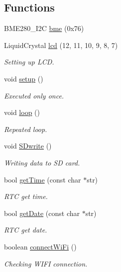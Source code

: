 \subsection*{Functions}
\begin{DoxyCompactItemize}
\item 
B\+M\+E280\+\_\+\+I2C \hyperlink{_w_s_8ino_aaa44a3bc15fc4819e1e0e66a80d6a693}{bme} (0x76)
\item 
Liquid\+Crystal \hyperlink{_w_s_8ino_aca85f744646bfbc6d0f732f3b0b938f3}{lcd} (12, 11, 10, 9, 8, 7)
\begin{DoxyCompactList}\small\item\em Setting up L\+CD. \end{DoxyCompactList}\item 
void \hyperlink{_w_s_8ino_a4fc01d736fe50cf5b977f755b675f11d}{setup} ()
\begin{DoxyCompactList}\small\item\em Executed only once. \end{DoxyCompactList}\item 
void \hyperlink{_w_s_8ino_afe461d27b9c48d5921c00d521181f12f}{loop} ()
\begin{DoxyCompactList}\small\item\em Repeated loop. \end{DoxyCompactList}\item 
void \hyperlink{_w_s_8ino_a5abc7cb0136096487b90a0a7001f1da6}{S\+Dwrite} ()
\begin{DoxyCompactList}\small\item\em Writing data to SD card. \end{DoxyCompactList}\item 
bool \hyperlink{_w_s_8ino_ae96ca3df2e8b9eef75d400de6ef06db3}{get\+Time} (const char $\ast$str)
\begin{DoxyCompactList}\small\item\em R\+TC get time. \end{DoxyCompactList}\item 
bool \hyperlink{_w_s_8ino_a100af87d91fcaa6f23f2ca6a2fe146cc}{get\+Date} (const char $\ast$str)
\begin{DoxyCompactList}\small\item\em R\+TC get date. \end{DoxyCompactList}\item 
boolean \hyperlink{_w_s_8ino_a144025702d7aa7708d704324ecb09eff}{connect\+Wi\+Fi} ()
\begin{DoxyCompactList}\small\item\em Checking W\+I\+FI connection. \end{DoxyCompactList}\item 

\end{DoxyCompactItemize}

